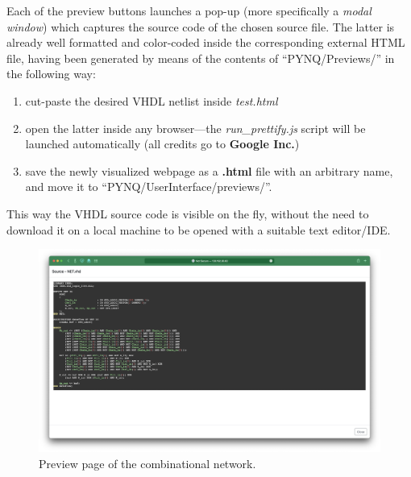 Each of the preview buttons launches a pop-up (more specifically a \emph{modal window}) which captures the source code of the chosen source file.
The latter is already well formatted and color-coded inside the corresponding external HTML file, having been generated by means of the contents of ``PYNQ/Previews/'' in the following way:
\begin{enumerate}
\item cut-paste the desired VHDL netlist inside \emph{test.html}
\item open the latter inside any browser---the \emph{run\_prettify.js} script will be launched automatically (all credits go to \textbf{Google Inc.})
\item save the newly visualized webpage as a \textbf{.html} file with an arbitrary name, and move it to ``PYNQ/UserInterface/previews/''.
\end{enumerate}
This way the VHDL source code is visible on the fly, without the need to download it on a local machine to be opened with a suitable text editor/IDE.
\begin{figure}[!ht]
\vspace{0.5cm}
\includegraphics[width=\textwidth]{images/net.png}
\caption{Preview page of the combinational network.}
\end{figure}